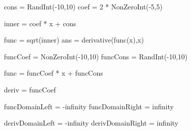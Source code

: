 

\begin{sagesilent}

cons = RandInt(-10,10)
coef = 2 * NonZeroInt(-5,5)

inner = coef * x + cons

func = sqrt(inner)
ans = derivative(func(x),x)

\end{sagesilent}




\begin{sagesilent}

funcCoef = NonZeroInt(-10,10)
funcCons = RandInt(-10,10)

func = funcCoef * x + funcCons

deriv = funcCoef

funcDomainLeft = -infinity
funcDomainRight = infinity

derivDomainLeft = -infinity
derivDomainRight = infinity
\end{sagesilent}

